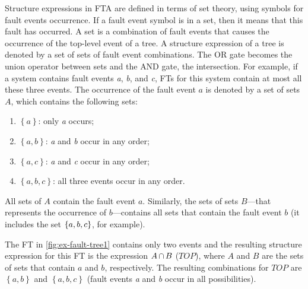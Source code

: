 \documentclass[12pt,openright,twoside,a4paper,oldfontcommands,english,brazil,draft]{abntex2}
\theoremstyle{theo}
\newcommand{\setsin}[1]{\ensuremath\left\{ #1 \right\}}
\def\inter{\ensuremath\operatorname{\cap}}
\begin{document}
Structure expressions in \ac{FTA} are defined in terms of set theory, using symbols for fault events occurrence.
If a fault event symbol is in a set, then it means that this fault has occurred.
A set is a combination of fault events that causes the occurrence of the top-level event of a tree.
A structure expression of a tree is denoted by a set of sets of fault event combinations.
The \ac{OR} gate becomes the union operator between sets and the \ac{AND} gate, the intersection.
For example, if a system contains fault events \emph{a}, \emph{b}, and \emph{c}, \aclp{FT} for this system contain at most all these three events.
The occurrence of the fault event $a$ is denoted by a set of sets $A$, which contains the following sets:
%
\begin{enumerate}
  \item\label{item:fta-only-a-occurs} $\left\{a\right\}$: only \emph{a} occurs;
  \item\label{item:fta-a-and-b-occur} $\left\{a,b\right\}$: \emph{a} and \emph{b} occur in any order;
  \item\label{item:fta-a-and-c-occur} $\left\{a,c\right\}$: \emph{a} and \emph{c} occur in any order;
  \item\label{item:fta-all-occur} $\left\{a,b,c\right\}$: all three events occur in any order.
\end{enumerate}
All sets of $A$ contain the fault event $a$.
Similarly, the sets of sets $B$---that represents the occurrence of $b$---contains all sets that contain the fault event $b$ (it includes the set $\setsin{a,b,c}$, for example).
%

The \acl{FT} in \cref{fig:ex-fault-tree1} contains only two events and the resulting structure expression for this \ac{FT} is the expression $A \inter B$ ($TOP$), where $A$ and $B$ are the sets of sets that contain $a$ and $b$, respectively.
The resulting combinations for $TOP$ are $\left\{a,b\right\}$ and $\left\{a,b,c\right\}$ (fault events \emph{a} and \emph{b} occur in all possibilities).
\end{document}

